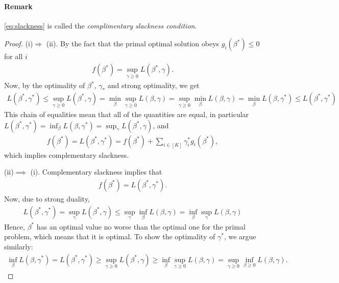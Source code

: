 \documentclass{article}
\begin{document}
\paragraph{Remark} \eqref{eq:slackness} is called the \emph{complimentary slackness condition}.

\begin{proof}
    (i)$\Rightarrow$ (ii). By the fact that the primal optimal solution obeys $g_i(\beta^*)\leq 0$ for all $i$
    \begin{align*}
        f(\beta^*) = \sup_{\gamma\geq 0} L(\beta^*,\gamma).
    \end{align*}
    Now, by the optimality of $\beta^*$, $\gamma_*$ and strong optimality, we get
    \begin{align*}
         L(\beta^*,\gamma^*) \leq \sup_{\gamma\geq 0} L(\beta^*,\gamma) = \min_{\beta} \sup_{\gamma \geq 0}L(\beta,\gamma) =  \sup_{\gamma \geq 0} \min_{\beta}L(\beta,\gamma) = \min_{\beta} L(\beta,\gamma^*) \leq L(\beta^*,\gamma^*)
    \end{align*}
    This chain of equalities mean that all of the quantities are equal, in particular $L(\beta^*,\gamma^*) = \inf_{\beta} L(\beta,\gamma^*) = \sup_\gamma L(\beta^*,\gamma)$, and
    \begin{align*}
        f(\beta^*) = L(\beta^*,\gamma^*) = f(\beta^*)+\sum_{i \in [K]} \gamma_i^*g_i(\beta^*), 
    \end{align*}
    which implies complementary slackness.

    (ii)$\implies$ (i). Complementary slackness implies that
    \begin{align*}
        f(\beta^*) = L(\beta^*,\gamma^*).
    \end{align*}
    Now, due to strong duality,
    \begin{align*}
        L(\beta^*,\gamma^*) = \sup_\gamma L(\beta^*,\gamma)\leq \sup_\gamma \inf_\beta L(\beta,\gamma) = \inf_\beta \sup_\gamma L(\beta,\gamma)
    \end{align*}
Hence, $\beta^*$ has an optimal value no worse than the optimal one for the primal problem, which means that it is optimal. To show the optimality of $\gamma^*$, we argue similarly:
\begin{align*}
    \inf_\beta L(\beta,\gamma^*) = L(\beta^*,\gamma^*) \geq \sup_{\gamma\geq 0} L(\beta^*,\gamma) \geq \inf_{\beta} \sup_{\gamma\geq 0} L(\beta,\gamma) = \sup_{\gamma \geq 0}\inf_{\beta\geq 0} L(\beta,\gamma).
\end{align*}
\end{proof}
\end{document}

